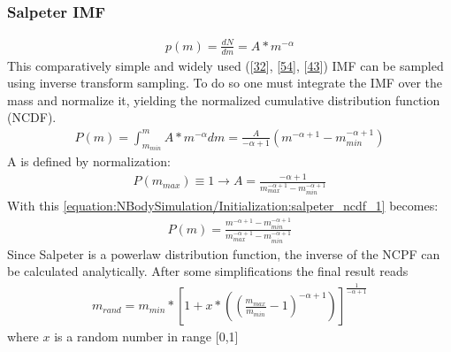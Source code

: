 \documentclass[letterpaper,10pt,english]{sphinxmanual}
\begin{document}
		
			\subsubsection{Salpeter IMF}
				\label{\detokenize{NBodySimulation/Initialization:salpeter-imf}}\begin{equation}\label{equation:NBodySimulation/Initialization:salpeter}
				\begin{split}p(m)=\frac{dN}{dm}=A*m^{-\alpha }\end{split}
				\end{equation}
				\sphinxAtStartPar
				This comparatively simple and widely used ({[}\hyperlink{cite.NBodySimulation/Appendix:id46}{32}{]}, {[}\hyperlink{cite.NBodySimulation/Appendix:id47}{54}{]}, {[}\hyperlink{cite.NBodySimulation/Appendix:id48}{43}{]}) IMF can be sampled using inverse transform sampling.
				To do so one must integrate the IMF over the mass and normalize it, yielding the normalized cumulative distribution function (NCDF).
				\begin{equation}\label{equation:NBodySimulation/Initialization:salpeter_ncdf_1}
				\begin{split}P(m)=\int_{m_{min}}^{m}A*m^{-\alpha } dm = \frac{A}{-\alpha +1}\left ( m^{-\alpha +1} -m_{min}^{-\alpha +1}\right )\end{split}
				\end{equation}
				\sphinxAtStartPar
				A is defined by normalization:
				\begin{equation*}
				\begin{split}P({m_{max}})\equiv 1\rightarrow A=\frac{-\alpha +1}{m_{max}^{-\alpha +1} -m_{min}^{-\alpha +1} }\end{split}
				\end{equation*}
				\sphinxAtStartPar
				With this \eqref{equation:NBodySimulation/Initialization:salpeter_ncdf_1} becomes:
				\begin{equation*}
				\begin{split}P(m)=\frac{m^{-\alpha +1} -m_{min}^{-\alpha +1}}{m_{max}^{-\alpha +1} -m_{min}^{-\alpha +1}}\end{split}
				\end{equation*}
				\sphinxAtStartPar
				Since Salpeter is a power\sphinxhyphen{}law distribution function, the inverse of the NCPF can be calculated analytically. After some simplifications the final result reads
				\begin{equation*}
				\begin{split}m_{rand} = m_{min}*\left [ 1+x*\left ( \left ( \frac{m_{max}}{m_{min}} -1\right )^{-\alpha +1} \right ) \right ]^{\frac{1}{-\alpha +1}}\end{split}
				\end{equation*}
				\sphinxAtStartPar
				where \(x\) is a random number in range {[}0,1{]}
				
\end{document}
